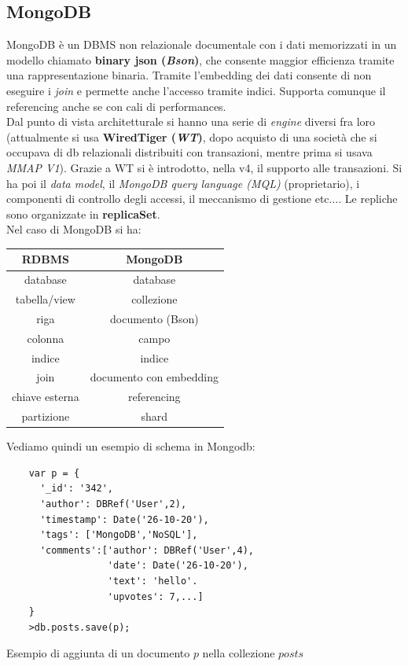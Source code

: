 \documentclass[a4paper,12pt, oneside]{book}
\begin{document}
\subsection{MongoDB}
MongoDB è un DBMS non relazionale documentale con i dati memorizzati in un
modello chiamato \textbf{binary json (\textit{Bson})}, che consente maggior
efficienza tramite una rappresentazione binaria. Tramite l'embedding dei dati
consente di non eseguire i \textit{join} e permette anche l'accesso tramite
indici. Supporta comunque il referencing anche se con cali di performances.\\
Dal punto di vista architetturale si hanno una serie di \textit{engine} diversi
fra loro (attualmente si usa \textbf{WiredTiger (\textit{WT})}, dopo acquisto
di una società che si occupava di db relazionali distribuiti con transazioni,
mentre prima si usava \textit{MMAP V1}). Grazie a WT si è introdotto, nella v4,
il supporto alle transazioni. Si ha poi il \textit{data model}, il
\textit{MongoDB query language (MQL)} (proprietario), i componenti di controllo
degli accessi, il meccanismo di gestione etc$\ldots$. Le repliche sono
organizzate in \textbf{replicaSet}.\\
Nel caso di MongoDB si ha:
\begin{table}[H]
  \centering
  \begin{tabular}{c|c}
    RDBMS & MongoDB\\
    \hline
    database & database \\
    tabella/view & collezione\\
    riga & documento (Bson)\\
    colonna & campo\\
    indice & indice\\
    join & documento con embedding\\
    chiave esterna & referencing\\
    partizione & shard
  \end{tabular}
\end{table}
Vediamo quindi un esempio di schema in Mongodb:
\begin{listing}[H]
  \begin{verbatim}
    var p = {
      '_id': '342',
      'author': DBRef('User',2),
      'timestamp': Date('26-10-20'),
      'tags': ['MongoDB','NoSQL'],
      'comments':['author': DBRef('User',4),
                  'date': Date('26-10-20'),
                  'text': 'hello'.
                  'upvotes': 7,...]
    }
    >db.posts.save(p);            
  \end{verbatim}
  \caption{Esempio di aggiunta di un documento $p$ nella collezione $posts$}
\end{listing}
\end{document}
